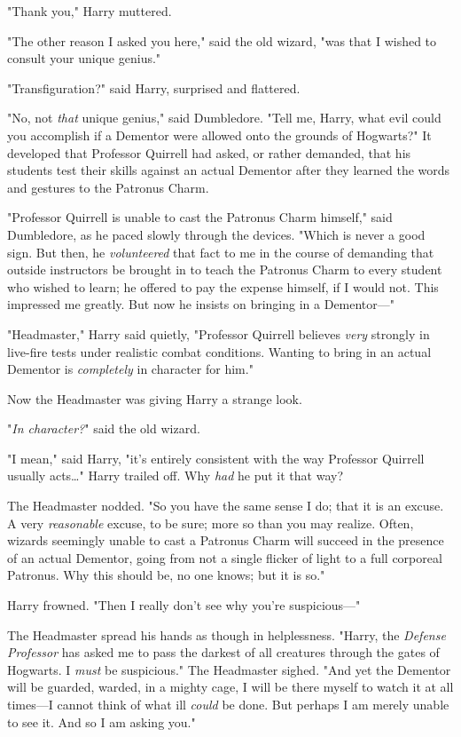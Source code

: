 "Thank you," Harry muttered.

"The other reason I asked you here," said the old wizard, "was that I wished to 
consult your unique genius."

"Transfiguration?" said Harry, surprised and flattered.

"No, not \emph{that} unique genius," said Dumbledore. "Tell me, Harry, what 
evil could you accomplish if a Dementor were allowed onto the grounds of 
Hogwarts?"
\sbreak
It developed that Professor Quirrell had asked, or rather demanded, that his 
students test their skills against an actual Dementor after they learned the 
words and gestures to the Patronus Charm.

"Professor Quirrell is unable to cast the Patronus Charm himself," said 
Dumbledore, as he paced slowly through the devices. "Which is never a good 
sign. But then, he \emph{volunteered} that fact to me in the course of 
demanding that outside instructors be brought in to teach the Patronus Charm to 
every student who wished to learn; he offered to pay the expense himself, if I 
would not. This impressed me greatly. But now he insists on bringing in a 
Dementor---"

"Headmaster," Harry said quietly, "Professor Quirrell believes \emph{very} 
strongly in live-fire tests under realistic combat conditions. Wanting to bring 
in an actual Dementor is \emph{completely} in character for him."

Now the Headmaster was giving Harry a strange look.

"\emph{In character?}" said the old wizard.

"I mean," said Harry, "it's entirely consistent with the way Professor Quirrell 
usually acts{\ldots}" Harry trailed off. Why \emph{had} he put it that way?

The Headmaster nodded. "So you have the same sense I do; that it is an excuse. 
A very \emph{reasonable} excuse, to be sure; more so than you may realize. 
Often, wizards seemingly unable to cast a Patronus Charm will succeed in the 
presence of an actual Dementor, going from not a single flicker of light to a 
full corporeal Patronus. Why this should be, no one knows; but it is so."

Harry frowned. "Then I really don't see why you're suspicious---"

The Headmaster spread his hands as though in helplessness. "Harry, the 
\emph{Defense Professor} has asked me to pass the darkest of all creatures 
through the gates of Hogwarts. I \emph{must} be suspicious." The Headmaster 
sighed. "And yet the Dementor will be guarded, warded, in a mighty cage, I will 
be there myself to watch it at all times---I cannot think of what ill 
\emph{could} be done. But perhaps I am merely unable to see it. And so I am 
asking you."

